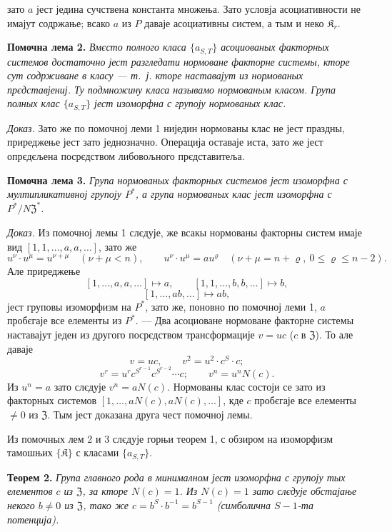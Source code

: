 \documentclass[11pt]{article}
\begin{document}
зато \(a\) јест једина сучствена константа множења. Зато условја асоциативности не имајут содржање; всако \(a\) из \(P\) даваје асоциативны систем, а тым и неко \(\mathfrak K_r\).

\noindent\textbf{Помочна лема 2.} \emph{Вмєсто полного класа \(\{a_{S,T}\}\) асоциованых факторных системов достаточно јест разгледати нормоване факторне системы, кторе сут содрживане в класу --- т.~ј. кторе наставајут из нормованых прєдставјениј. Ту подмножину класа называмо нормованым класом. Група полных клас \(\{a_{S,T}\}\) јест изоморфна с групоју нормованых клас.}

\noindent\emph{Доказ.} Зато же по помочној леми 1 ниједин нормованы клас не јест праздны, приреджење јест зато једнозначно. Операција оставаје иста, зато же јест опрєдєљена посрєдством либовољного прєдставитеља.

\noindent\textbf{Помочна лема 3.} \emph{Група нормованых факторных системов јест изоморфна с мултипликативној групоју \(P^*\), а група нормованых клас јест изоморфна с \(P^*/N\mathfrak Z^*\).}

\noindent\emph{Доказ.} Из помочној лемы 1 слєдује, же всакы нормованы факторны систем имаје вид \([1,1,\ldots,a,a,\ldots]\), зато же
\[
u^\nu\cdot u^\mu=u^{\nu+\mu}\quad(\nu+\mu<n),
\qquad
u^\nu\cdot u^\mu=au^\varrho\quad(\nu+\mu=n+\varrho,\ 0\leq\varrho\leq n-2).
\]
Але приреджење
\[
[1,\ldots,a,a,\ldots]\mapsto a,
\qquad
[1,1,\ldots,b,b,\ldots]\mapsto b,
\]
\[
[1,\ldots,ab,\ldots]\mapsto ab,
\]
јест груповы изоморфизм на \(P^*\), зато же, поновно по помочној леми 1, \(a\) пробєгаје все елементы из \(P^*\). --- Два асоциоване нормоване факторне системы наставајут једен из другого посрєдством трансформације \(v=uc\) (\(c\) в \(\mathfrak Z\)). То але даваје
\[
v=uc,\qquad v^2=u^2\cdot c^S\cdot c;
\]
\[
v^r=u^r c^{S^{r-1}}c^{S^{r-2}}\cdots c;
\qquad
v^n=u^nN(c).
\]
Из \(u^n=a\) зато слєдује \(v^n=aN(c)\). Нормованы клас состоји се зато из факторных системов \([1,\ldots,aN(c),aN(c),\ldots]\), кде \(c\) пробєгаје все елементы \(\neq0\) из \(\mathfrak Z\). Тым јест доказана друга чест помочној лемы.

Из помочных лем 2 и 3 слєдује горњи теорем 1, с обзиром на изоморфизм тамошњих \(\{\mathfrak K\}\) с класами \(\{a_{S,T}\}\).

\noindent\textbf{Теорем 2.} \emph{Група главного рода в минималном јест изоморфна с групоју тых елементов \(c\) из \(\mathfrak Z\), за кторе \(N(c)=1\). Из \(N(c)=1\) зато слєдује обстајање некого \(b\neq0\) из \(\mathfrak Z\), тако же \(c=b^S\cdot b^{-1}=b^{S-1}\) (симболична \(S-1\)-та потенција).}
\end{document}
